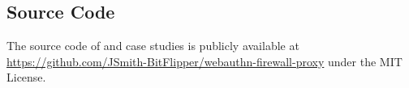






\subsection{Source Code}

The source code of \sys{} and case studies is publicly available at \url{https://github.com/JSmith-BitFlipper/webauthn-firewall-proxy} under the MIT License.

